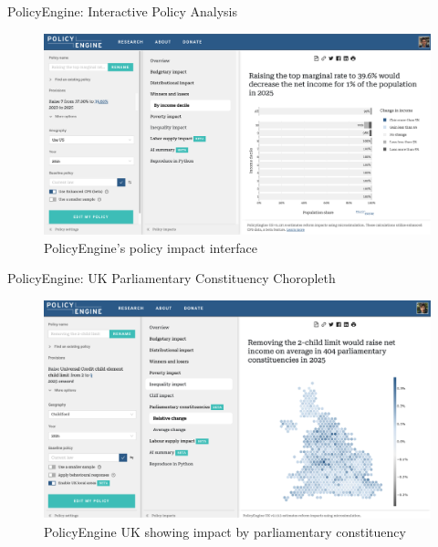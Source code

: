 \documentclass{beamer}
\begin{document}
\begin{frame}{PolicyEngine: Interactive Policy Analysis}
    \begin{figure}
        \centering
        \includegraphics[width=\textwidth]{../../paper/figures/policyengine_results.png}
        \caption{PolicyEngine's policy impact interface}
    \end{figure}
\end{frame}


\begin{frame}{PolicyEngine: UK Parliamentary Constituency Choropleth}
    \begin{figure}
        \centering
        \includegraphics[width=\textwidth]{../../paper/figures/uk_choropleth.png}
        \caption{PolicyEngine UK showing impact by parliamentary constituency}
    \end{figure}
\end{frame}
\end{document}
